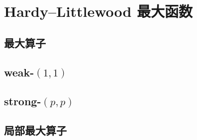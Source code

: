 \section{Hardy–Littlewood 最大函数}
\label{b1:sec:1303}


\subsection{最大算子}
\label{b1:subsec:130301}

\subsection{weak-\texorpdfstring{\((1,1)\)}{(1,1)}}
\label{b1:subsec:130302}

\subsection{strong-\texorpdfstring{\((p,p)\)}{(p,p)}}
\label{b1:subsec:130303}

\subsection{局部最大算子}
\label{b1:subsec:130304}


